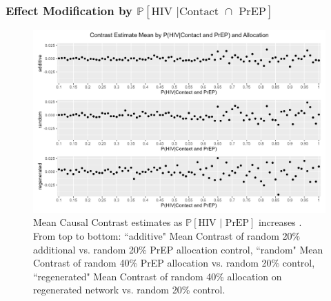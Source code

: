 \documentclass{article}
\theoremstyle{definition}
\begin{document}
\subsubsection{Effect Modification by \texorpdfstring{$\mathbb{P}\left[\text{HIV } \vert \text {Contact } \cap \text{ PrEP}\right]$}{ℙ[HIV | PrEP]}}
\begin{figure}[H]
    \centering
    \includegraphics[width=\linewidth]{Figures/p2 Mean plots.png}
    \caption{Mean Causal Contrast estimates as $\mathbb{P}\left[\text{HIV } \vert \text{ PrEP}\right]$ increases . From top to bottom: ``additive" Mean Contrast of random 20\% additional vs. random 20\% PrEP allocation control, ``random" Mean Contrast of random 40\% PrEP allocation vs. random 20\% control, ``regenerated" Mean Contrast of random 40\% allocation on regenerated network vs. random 20\% control.}
    \label{fig:Figure 15}

\end{figure}
\end{document}
